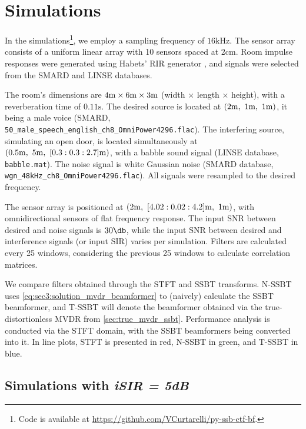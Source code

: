 
\section{Simulations}
\label{sec:results}

In the simulations\footnote{Code is available at \url{https://github.com/VCurtarelli/py-ssb-ctf-bf}.}, we employ a sampling frequency of $16\si{\kilo\hertz}$. The sensor array consists of a uniform linear array with 10 sensors spaced at $2\si{\cm}$. Room impulse responses were generated using Habets' RIR generator \cite{habets_rir-generator}, and signals were selected from the SMARD \cite{smard_database} and LINSE \cite{linse_database} databases.

The room's dimensions are $4\si{\meter} \times 6\si{\meter} \times 3\si{\meter}$ (width $\times$ length $\times$ height), with a reverberation time of $0.11\si{\second}$. The desired source is located at $(2\si{\meter},~1\si{\meter},~1\si{\meter})$, it being a male voice (SMARD, \texttt{50\_male\_speech\_english\_ch8\_OmniPower4296.flac}).
%
The interfering source, simulating an open door, is located simultaneously at $(0.5\si{\meter},~5\si{\meter},~[0.3:0.3:2.7]\si{\meter})$, with a babble sound signal (LINSE database, \texttt{babble.mat}). The noise signal is white Gaussian noise (SMARD database, \texttt{wgn\_48kHz\_ch8\_OmniPower4296.flac}). All signals were resampled to the desired frequency.

The sensor array is positioned at $(2\si{\meter},~[4.02:0.02:4.2]\si{\meter},~1\si{\meter})$, with omnidirectional sensors of flat frequency response. The input SNR between desired and noise signals is $30\dB$, while the input SNR between desired and interference signals (or input SIR) varies per simulation. Filters are calculated every 25 windows, considering the previous 25 windows to calculate correlation matrices.

We compare filters obtained through the STFT and SSBT transforms. N-SSBT uses \cref{eq:sec3:solution_mvdr_beamformer} to (naively) calculate the SSBT beamformer, and T-SSBT will denote the beamformer obtained via the true-distortionless MVDR from \cref{sec:true_mvdr_ssbt}. Performance analysis is conducted via the STFT domain, with the SSBT beamformers being converted into it. In line plots, STFT is presented in red, N-SSBT in green, and T-SSBT in blue.


\subsection{Simulations with \emph{iSIR = 5dB}}


